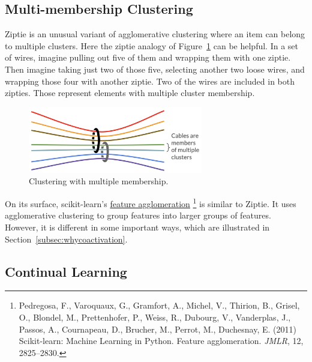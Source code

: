 \subsection{Multi-membership Clustering}
\label{subsec:multimembership}

Ziptie is an unusual variant of agglomerative clustering where an item
can belong to multiple clusters. Here the ziptie analogy of
Figure~\ref{fig:multimember} can be helpful.
In a set of wires, imagine pulling out five of them and wrapping them
with one ziptie. Then imagine taking just two of those five, selecting another
two loose wires, and wrapping those four with another ziptie.
Two of the wires are included in both zipties. Those represent elements
with multiple cluster membership.

\begin{figure}[ht]
\vskip 0.0in
\begin{center}
\centerline{\includegraphics[width=3.0in]{images/multimember.png}}
\caption{Clustering with multiple membership.}
\label{fig:multimember}
\end{center}
\vskip -0.2in
\end{figure}


On its surface,
scikit-learn's
\href{https://scikit-learn.org/stable/auto_examples/cluster/plot_digits_agglomeration.html#sphx-glr-auto-examples-cluster-plot-digits-agglomeration-py}
{feature agglomeration}
\footnote{Pedregosa, F., Varoquaux, G., Gramfort, A., Michel, V.,
Thirion, B., Grisel, O., Blondel, M., Prettenhofer, P.,
Weiss, R., Dubourg, V., Vanderplas, J., Passos, A.,
Cournapeau, D., Brucher, M., Perrot, M., Duchesnay, E. (2011)
Scikit-learn: Machine Learning in Python. Feature agglomeration.
\textit{JMLR}, 12, 2825–2830.}
is similar to Ziptie.
It uses agglomerative clustering to group
features into larger groups of features. However, it is different in
some important ways, which are illustrated in
Section~\ref{subsec:whycoactivation}.

\subsection{Continual Learning}
\label{subsec:continual}

